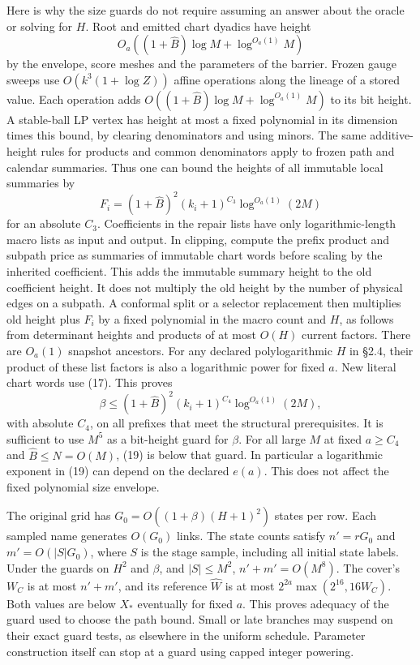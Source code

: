 \documentclass[11pt]{article}
\begin{document}
Here is why the size guards do not require assuming an answer about the oracle or solving for \(H\). Root and emitted chart dyadics have height
\[
                    O_a((1+\widehat B)\log M+\log^{O_a(1)} M)
\tag{17}
\]
by the envelope, score meshes and the parameters of the barrier. Frozen gauge sweeps use \(O(k^3(1+\log Z))\) affine operations along the lineage of a stored value. Each operation adds \(O((1+\widehat B)\log M+\log^{O_a(1)}M)\) to its bit height. A stable-ball LP vertex has height at most a fixed polynomial in its dimension times this bound, by clearing denominators and using minors. The same additive-height rules for products and common denominators apply to frozen path and calendar summaries. Thus one can bound the heights of all immutable local summaries by
\[
 F_i=(1+\widehat B)^2(k_i+1)^{C_3}\log^{O_a(1)}(2M)
\tag{18}
\]
for an absolute \(C_3\). Coefficients in the repair lists have only logarithmic-length macro lists as input and output. In clipping, compute the prefix product and subpath price as summaries of immutable chart words before scaling by the inherited coefficient. This adds the immutable summary height to the old coefficient height. It does not multiply the old height by the number of physical edges on a subpath. A conformal split or a selector replacement then multiplies old height plus \(F_i\) by a fixed polynomial in the macro count and \(H\), as follows from determinant heights and products of at most \(O(H)\) current factors. There are \(O_a(1)\) snapshot ancestors. For any declared polylogarithmic \(H\) in §2.4, their product of these list factors is also a logarithmic power for fixed \(a\). New literal chart words use (17). This proves
\[
 \beta\le (1+\widehat B)^2(k_i+1)^{C_4}\log^{O_a(1)}(2M),
\tag{19}
\]
with absolute \(C_4\), on all prefixes that meet the structural prerequisites. It is sufficient to use \(M^5\) as a bit-height guard for \(\beta\). For all large \(M\) at fixed \(a\ge C_4\) and \(\widehat B\le N=O(M)\), (19) is below that guard. In particular a logarithmic exponent in (19) can depend on the declared \(e(a)\). This does not affect the fixed polynomial size envelope.

The original grid has \(G_0=O((1+\beta)(H+1)^2)\) states per row. Each sampled name generates \(O(G_0)\) links. The state counts satisfy \(n'=rG_0\) and \(m'=O(|S|G_0)\), where \(S\) is the stage sample, including all initial state labels. Under the guards on \(H^2\) and \(\beta\), and \(|S|\le M^2\), \(n'+m'=O(M^8)\). The cover's \(W_C\) is at most \(n'+m'\), and its reference \(\widehat W\) is at most \(2^{2a}\max(2^{16},16W_C)\). Both values are below \(X_*\) eventually for fixed \(a\). This proves adequacy of the guard used to choose the path bound. Small or late branches may suspend on their exact guard tests, as elsewhere in the uniform schedule. Parameter construction itself can stop at a guard using capped integer powering.
\end{document}
